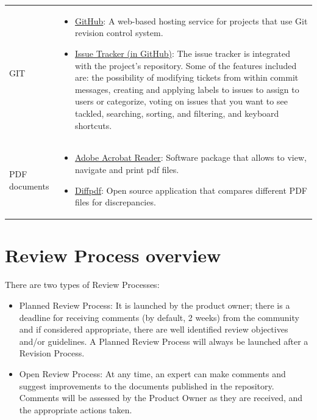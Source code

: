 \documentclass{template/openetcs_article}
\begin{document}
\begin{flushleft}

\begin{tabular}{|m{3cm}|m{11cm}|}
\hline
\rowcolor{myblue}
\multicolumn{2}{|c|}{Tools} \\\hline
GIT &
\begin{itemize}
\item \underline{GitHub}: A web-based hosting service for projects that use Git revision control system.
\item \underline{Issue Tracker (in GitHub)}: The issue tracker is integrated with the project's repository. Some of the features included are: the possibility of modifying tickets from within commit messages,
creating and applying labels to issues to assign to users or categorize, voting on issues that you want to see tackled, searching, sorting, and filtering, and keyboard shortcuts.
\end{itemize}
\\\hline
PDF documents &
\begin{itemize}
\item \underline{Adobe Acrobat Reader}: Software package that allows to view, navigate and print pdf files.
\item \underline{Diffpdf}: Open source application that compares different PDF files for discrepancies. 
\end{itemize}
\\\hline
\end{tabular}
\end{flushleft}

\section{Review Process overview}

There are two types of Review Processes:
\begin{itemize}
\item Planned Review Process: It is launched by the product owner; there is a deadline for receiving comments (by default, 2 weeks) from the community and if considered appropriate, there are well identified review objectives and/or guidelines. A Planned Review Process will always be launched after a Revision Process.
\item Open Review Process: At any time, an expert can make comments and suggest improvements to the documents published in the repository. Comments will be assessed by the Product Owner as they are received, and the appropriate actions taken.
\end{itemize}
\end{document}
